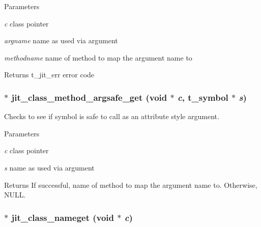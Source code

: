 \begin{DoxyParams}{Parameters}
\item[{\em c}]class pointer \item[{\em argname}]name as used via argument \item[{\em methodname}]name of method to map the argument name to\end{DoxyParams}
\begin{DoxyReturn}{Returns}
t\_\-jit\_\-err error code 
\end{DoxyReturn}
\hypertarget{group__classmod_ga5ace294def3c0e31d3890d2f9be1af68}{
\subsubsection[{jit\_\-class\_\-method\_\-argsafe\_\-get}]{$\ast$ jit\_\-class\_\-method\_\-argsafe\_\-get (void $\ast$ {\em c}, \/  {\bf t\_\-symbol} $\ast$ {\em s})}}
\label{group__classmod_ga5ace294def3c0e31d3890d2f9be1af68}


Checks to see if symbol is safe to call as an attribute style argument. 
\begin{DoxyParams}{Parameters}
\item[{\em c}]class pointer \item[{\em s}]name as used via argument\end{DoxyParams}
\begin{DoxyReturn}{Returns}
If successful, name of method to map the argument name to. Otherwise, NULL. 
\end{DoxyReturn}
\hypertarget{group__classmod_ga5af7e1d4e070475ad79840c0ca3e6f86}{
\subsubsection[{jit\_\-class\_\-nameget}]{$\ast$ jit\_\-class\_\-nameget (void $\ast$ {\em c})}}
\label{group__classmod_ga5af7e1d4e070475ad79840c0ca3e6f86}


